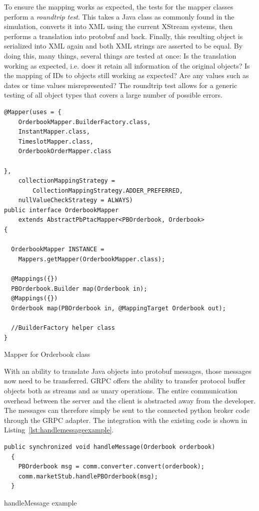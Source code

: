 To ensure the mapping works as expected, the tests for the mapper classes perform a \emph{roundtrip test}. This takes a
Java class as commonly found in the simulation, converts it into \ac{XML} using the current XStream systems, then
performs a translation into protobuf  and back. Finally, this resulting object is serialized into \ac{XML} again and
both \ac{XML} strings are asserted to be equal. By doing this, many things, several things are tested at once: Is the
translation working as expected, i.e. does it retain all information of the original objects? Is the mapping of IDs to
objects still working as expected? Are any values such as dates or time values misrepresented? The roundtrip test allows
for a generic testing of all object types that covers a large number of possible errors.

\begin{listing}[]
    \begin{verbatim}
@Mapper(uses = {
    OrderbookMapper.BuilderFactory.class,
    InstantMapper.class,
    TimeslotMapper.class,
    OrderbookOrderMapper.class

},
    collectionMappingStrategy =
        CollectionMappingStrategy.ADDER_PREFERRED,
    nullValueCheckStrategy = ALWAYS)
public interface OrderbookMapper
    extends AbstractPbPtacMapper<PBOrderbook, Orderbook>
{

  OrderbookMapper INSTANCE =
    Mappers.getMapper(OrderbookMapper.class);

  @Mappings({})
  PBOrderbook.Builder map(Orderbook in);
  @Mappings({})
  Orderbook map(PBOrderbook in, @MappingTarget Orderbook out);

  //BuilderFactory helper class
}
    \end{verbatim}
    \caption{Mapper for Orderbook class}
    \label{lst:mapperexample}
\end{listing}

With an ability to translate Java objects into protobuf messages, those messages now need to be transferred. \ac{GRPC}
offers the ability to transfer protocol buffer objects both as streams and as unary operations. The entire communication
overhead between the server and the client is abstracted away from the developer. The messages can therefore simply be
sent to the connected python broker code through the \ac{GRPC} adapter. The integration with the existing code is shown
in Listing~\ref{lst:handlemessageexample}.

\begin{listing}
    \begin{verbatim}
public synchronized void handleMessage(Orderbook orderbook)
  {
    PBOrderbook msg = comm.converter.convert(orderbook);
    comm.marketStub.handlePBOrderbook(msg);
  }
    \end{verbatim}
    \caption{handleMessage example}
    \label{lst:handlemessageexample}
\end{listing}

